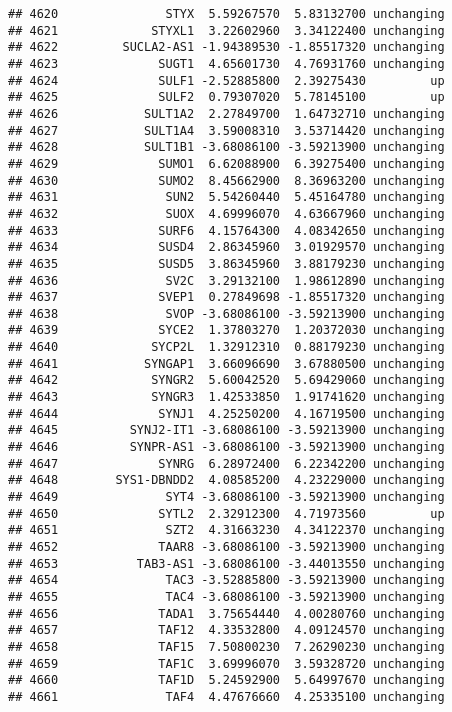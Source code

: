 \documentclass[]{article}
\begin{document}
\begin{verbatim}
## 4620               STYX  5.59267570  5.83132700 unchanging
## 4621             STYXL1  3.22602960  3.34122400 unchanging
## 4622         SUCLA2-AS1 -1.94389530 -1.85517320 unchanging
## 4623              SUGT1  4.65601730  4.76931760 unchanging
## 4624              SULF1 -2.52885800  2.39275430         up
## 4625              SULF2  0.79307020  5.78145100         up
## 4626            SULT1A2  2.27849700  1.64732710 unchanging
## 4627            SULT1A4  3.59008310  3.53714420 unchanging
## 4628            SULT1B1 -3.68086100 -3.59213900 unchanging
## 4629              SUMO1  6.62088900  6.39275400 unchanging
## 4630              SUMO2  8.45662900  8.36963200 unchanging
## 4631               SUN2  5.54260440  5.45164780 unchanging
## 4632               SUOX  4.69996070  4.63667960 unchanging
## 4633              SURF6  4.15764300  4.08342650 unchanging
## 4634              SUSD4  2.86345960  3.01929570 unchanging
## 4635              SUSD5  3.86345960  3.88179230 unchanging
## 4636               SV2C  3.29132100  1.98612890 unchanging
## 4637              SVEP1  0.27849698 -1.85517320 unchanging
## 4638               SVOP -3.68086100 -3.59213900 unchanging
## 4639              SYCE2  1.37803270  1.20372030 unchanging
## 4640             SYCP2L  1.32912310  0.88179230 unchanging
## 4641            SYNGAP1  3.66096690  3.67880500 unchanging
## 4642             SYNGR2  5.60042520  5.69429060 unchanging
## 4643             SYNGR3  1.42533850  1.91741620 unchanging
## 4644              SYNJ1  4.25250200  4.16719500 unchanging
## 4645          SYNJ2-IT1 -3.68086100 -3.59213900 unchanging
## 4646          SYNPR-AS1 -3.68086100 -3.59213900 unchanging
## 4647              SYNRG  6.28972400  6.22342200 unchanging
## 4648        SYS1-DBNDD2  4.08585200  4.23229000 unchanging
## 4649               SYT4 -3.68086100 -3.59213900 unchanging
## 4650              SYTL2  2.32912300  4.71973560         up
## 4651               SZT2  4.31663230  4.34122370 unchanging
## 4652              TAAR8 -3.68086100 -3.59213900 unchanging
## 4653           TAB3-AS1 -3.68086100 -3.44013550 unchanging
## 4654               TAC3 -3.52885800 -3.59213900 unchanging
## 4655               TAC4 -3.68086100 -3.59213900 unchanging
## 4656              TADA1  3.75654440  4.00280760 unchanging
## 4657              TAF12  4.33532800  4.09124570 unchanging
## 4658              TAF15  7.50800230  7.26290230 unchanging
## 4659              TAF1C  3.69996070  3.59328720 unchanging
## 4660              TAF1D  5.24592900  5.64997670 unchanging
## 4661               TAF4  4.47676660  4.25335100 unchanging

\end{verbatim}
\end{document}
